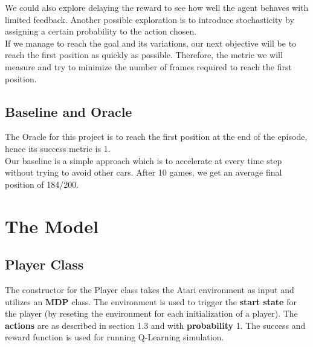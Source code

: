 \documentclass[10pt,twocolumn,letterpaper]{article}
\begin{document}
We could also explore delaying the reward to see how well the agent behaves with limited feedback. Another possible exploration is to introduce stochasticity by assigning a certain probability to the action chosen.
\\

If we manage to reach the goal and its variations, our next objective will be to reach the first position as quickly as possible. Therefore, the metric we will measure and try to minimize the number of frames required to reach the first position.






\subsection{Baseline and Oracle}

The Oracle for this project is to reach the first position at the end of the episode, hence its success metric is 1.\\

Our baseline is a simple approach which is to accelerate at every time step without trying to avoid other cars. After 10 games, we get an average final position of 184/200.

\section{The Model}
\subsection{Player Class}
The constructor for the Player class takes the Atari environment as input and utilizes an \textbf{MDP} class. The environment is used to trigger the \textbf{start state} for the player (by reseting the environment for each initialization of a player). The \textbf{actions} are as described in section 1.3 and with \textbf{probability} 1. The success and reward function is used for running Q-Learning simulation. 
\end{document}
